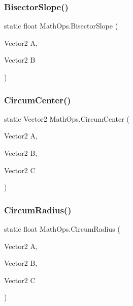 \mbox{\label{class_math_ops_a8143187da9ccc8eb4d7e2e6d89f2008b}} 
\subsubsection{\texorpdfstring{Bisector\+Slope()}{BisectorSlope()}}
{\footnotesize\ttfamily static float Math\+Ops.\+Bisector\+Slope (\begin{DoxyParamCaption}\item[{Vector2}]{A,  }\item[{Vector2}]{B }\end{DoxyParamCaption})\hspace{0.3cm}{\ttfamily [static]}}

\mbox{\label{class_math_ops_aac4861e44cbbf5c8e3f8e7aee06d5ed0}} 
\subsubsection{\texorpdfstring{Circum\+Center()}{CircumCenter()}}
{\footnotesize\ttfamily static Vector2 Math\+Ops.\+Circum\+Center (\begin{DoxyParamCaption}\item[{Vector2}]{A,  }\item[{Vector2}]{B,  }\item[{Vector2}]{C }\end{DoxyParamCaption})\hspace{0.3cm}{\ttfamily [static]}}

\mbox{\label{class_math_ops_a79f3f44aa12a5804b6e6ff7874c62cbd}} 
\subsubsection{\texorpdfstring{Circum\+Radius()}{CircumRadius()}}
{\footnotesize\ttfamily static float Math\+Ops.\+Circum\+Radius (\begin{DoxyParamCaption}\item[{Vector2}]{A,  }\item[{Vector2}]{B,  }\item[{Vector2}]{C }\end{DoxyParamCaption})\hspace{0.3cm}{\ttfamily [static]}}

